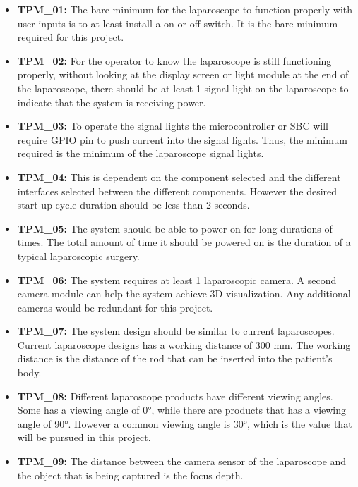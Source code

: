 \begin{itemize}
     

    \item\textbf{TPM\_01:} The bare minimum for the laparoscope to function properly with user inputs is to at least install a on or off switch. It is the bare minimum required for this project.

    \item\textbf{TPM\_02:} For the operator to know the laparoscope is still functioning properly, without looking at the display screen or light module at the end of the laparoscope, there should be at least 1 signal light on the laparoscope to indicate that the system is receiving power.

    \item\textbf{TPM\_03:} To operate the signal lights the microcontroller or SBC will require GPIO pin to push current into the signal lights. Thus, the minimum required is the minimum of the laparoscope signal lights.

    \item\textbf{TPM\_04:} This is dependent on the component selected and the different interfaces selected between the different components. However the desired start up cycle duration should be less than 2 seconds.

    \item\textbf{TPM\_05:} The system should be able to power on for long durations of times. The total amount of time it should be powered on is the duration of a typical laparoscopic surgery. 

    \item\textbf{TPM\_06:} The system requires at least 1 laparoscopic camera. A second camera module can help the system achieve 3D visualization. Any additional cameras would be redundant for this project.

    \item\textbf{TPM\_07:} The system design should be similar to current laparoscopes. Current laparoscope designs has a working distance of 300 mm. The working distance is the distance of the rod that can be inserted into the patient's body.

    \item\textbf{TPM\_08:} Different laparoscope products have different viewing angles. Some has a viewing angle of 0°, while there are products that has a viewing angle of 90°. However a common viewing angle is 30°, which is the value that will be pursued in this project.

    \item\textbf{TPM\_09:} The distance between the camera sensor of the laparoscope and the object that is being captured is the focus depth. 


\end{itemize}

